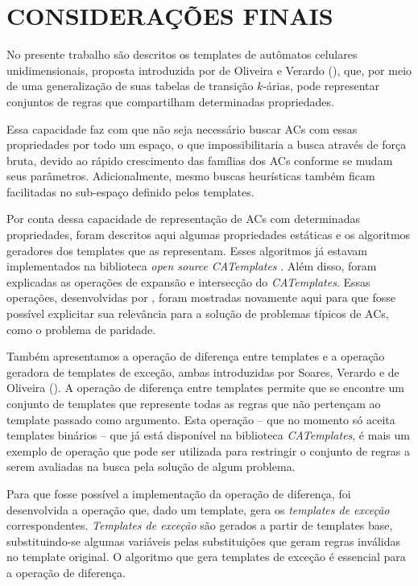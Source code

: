 \section{CONSIDERAÇÕES FINAIS}
\label{sec:consideracoesFinais}

No presente trabalho são descritos os templates de autômatos celulares unidimensionais, proposta introduzida por de Oliveira e Verardo (\citeyear{deOliveira2014}), que, por meio de uma generalização de suas tabelas de transição $k$-árias, pode representar conjuntos de regras que compartilham determinadas propriedades.

Essa capacidade faz com que não seja necessário buscar ACs com essas propriedades por todo um espaço, o que impossibilitaria a busca através de força bruta, devido ao rápido crescimento das famílias dos ACs conforme se mudam seus parâmetros. Adicionalmente, mesmo buscas heurísticas também ficam facilitadas no sub-espaço definido pelos templates.

Por conta dessa capacidade de representação de ACs com determinadas propriedades, foram descritos aqui algumas propriedades estáticas e os algoritmos geradores dos templates que as representam. Esses algoritmos já estavam implementados na biblioteca \textit{open source} \textit{CATemplates} \cite{CATemplates}. Além disso, foram explicadas as operações de expansão e intersecção do \textit{CATemplates}. Essas operações, desenvolvidas por , foram mostradas novamente aqui para que fosse possível explicitar sua relevância para a solução de problemas típicos de ACs, como o problema de paridade.

Também apresentamos a operação de diferença entre templates e a operação geradora de templates de exceção, ambas introduzidas por Soares, Verardo e de Oliveira (\citeyear{soares2016difference}). A operação de diferença entre templates permite que se encontre um conjunto de templates que represente todas as regras que não pertençam ao template passado como argumento. Esta operação -- que no momento só aceita templates binários -- que já está disponível na biblioteca \textit{CATemplates}, é mais um exemplo de operação que pode ser utilizada para restringir o conjunto de regras a serem avaliadas na busca pela solução de algum problema.

Para que fosse possível a implementação da operação de diferença, foi desenvolvida a operação que, dado um template, gera os \textit{templates de exceção} correspondentes. \textit{Templates de exceção} são gerados a partir de templates base, substituindo-se algumas variáveis pelas substituições que geram regras inválidas no template original. O algoritmo que gera templates de exceção é essencial para a operação de diferença.

